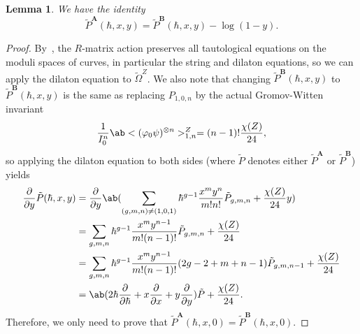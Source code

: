 \documentclass[10pt]{amsart}
\newtheorem{lem}[thm]{Lemma}
\theoremstyle{definition}
\theoremstyle{remark}
\theoremstyle{plain}
\theoremstyle{definition}
\theoremstyle{remark}
\newcommand{\bA}{\mathbf{A}}
\newcommand{\bB}{\mathbf{B}}
\newcommand{\1}{\mathbf{1}}
\newcommand{\2}{\mathbf{2}}
\newcommand{\3}{\mathbf{3}}
\numberwithin{equation}{section}
\begin{document}
\begin{lem}
    We have the identity
    \[ \tilde{P}^{\bA}(\hbar, x, y) = \tilde{P}^{\bB}(\hbar, x, y) - \log(1-y). \]
\end{lem}

\begin{proof}
    By~\cite[Theorem 5]{invtauteqns}, the $R$-matrix action preserves all tautological equations on the moduli spaces of curves, in particular the string and dilaton equations, so we can apply the dilaton equation to $\tilde{\Omega}^Z$. We also note that changing $\tilde{P}^{\bB}(\hbar, x, y)$ to $\tilde{P}^{\bB}(\hbar, x, y)$ is the same as replacing $P_{1,0,n}$ by the actual Gromov-Witten invariant
    \[ \frac{1}{I_0^n} \ab<(\varphi_0\psi)^{\otimes n}>_{1,n}^Z = (n-1)! \frac{\chi(Z)}{24}, \]
    so applying the dilaton equation to both sides (where $\tilde{P}$ denotes either $\tilde{P}^{\bA}$ or $\tilde{P}^{\bB}$) yields
    \begin{align*}
        \pdv{}{y} \tilde{P}(\hbar, x, y) &= \pdv{}{y}\ab( \sum_{(g,m,n) \neq (1,0,1)} \hbar^{g-1} \frac{x^m y^n}{m!n!} \tilde{P}_{g,m,n} + \frac{\chi(Z)}{24} y ) \\
        &= \sum_{g,m,n} \hbar^{g-1} \frac{x^m y^{n-1}}{m!(n-1)!} \tilde{P}_{g,m,n} + \frac{\chi(Z)}{24} \\
        &= \sum_{g,m,n} \hbar^{g-1} \frac{x^m y^{n-1}}{m!(n-1)!} (2g-2+m+n-1) \tilde{P}_{g,m,n-1} + \frac{\chi(Z)}{24} \\
        &= \ab(2\hbar \pdv{}{\hbar} + x \pdv{}{x} + y \pdv{}{y}) \tilde{P} + \frac{\chi(Z)}{24}.
    \end{align*}
    Therefore, we only need to prove that $\tilde{P}^{\bA}(\hbar, x, 0) = \tilde{P}^{\bB}(\hbar, x, 0)$.


\end{proof}
\end{document}

